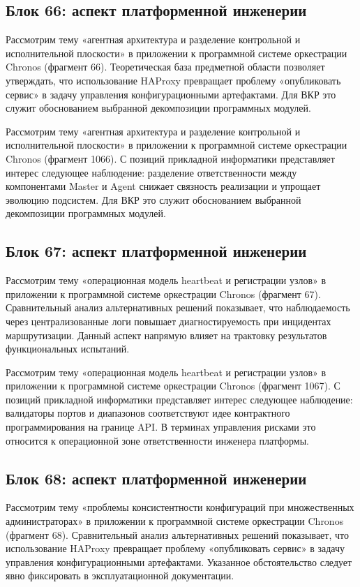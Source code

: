 \subsection{Блок 66: аспект платформенной инженерии}
 Рассмотрим тему «агентная архитектура и разделение контрольной и исполнительной плоскости» в приложении к программной системе оркестрации Chronos (фрагмент 66). Теоретическая база предметной области позволяет утверждать, что использование HAProxy превращает проблему «опубликовать сервис» в задачу управления конфигурационными артефактами. Для ВКР это служит обоснованием выбранной декомпозиции программных модулей.

 Рассмотрим тему «агентная архитектура и разделение контрольной и исполнительной плоскости» в приложении к программной системе оркестрации Chronos (фрагмент 1066). С позиций прикладной информатики представляет интерес следующее наблюдение: разделение ответственности между компонентами Master и Agent снижает связность реализации и упрощает эволюцию подсистем. Для ВКР это служит обоснованием выбранной декомпозиции программных модулей.

\subsection{Блок 67: аспект платформенной инженерии}
 Рассмотрим тему «операционная модель heartbeat и регистрации узлов» в приложении к программной системе оркестрации Chronos (фрагмент 67). Сравнительный анализ альтернативных решений показывает, что наблюдаемость через централизованные логи повышает диагностируемость при инцидентах маршрутизации. Данный аспект напрямую влияет на трактовку результатов функциональных испытаний.

 Рассмотрим тему «операционная модель heartbeat и регистрации узлов» в приложении к программной системе оркестрации Chronos (фрагмент 1067). С позиций прикладной информатики представляет интерес следующее наблюдение: валидаторы портов и диапазонов соответствуют идее контрактного программирования на границе API. В терминах управления рисками это относится к операционной зоне ответственности инженера платформы.

\subsection{Блок 68: аспект платформенной инженерии}
 Рассмотрим тему «проблемы консистентности конфигураций при множественных администраторах» в приложении к программной системе оркестрации Chronos (фрагмент 68). Сравнительный анализ альтернативных решений показывает, что использование HAProxy превращает проблему «опубликовать сервис» в задачу управления конфигурационными артефактами. Указанное обстоятельство следует явно фиксировать в эксплуатационной документации.

